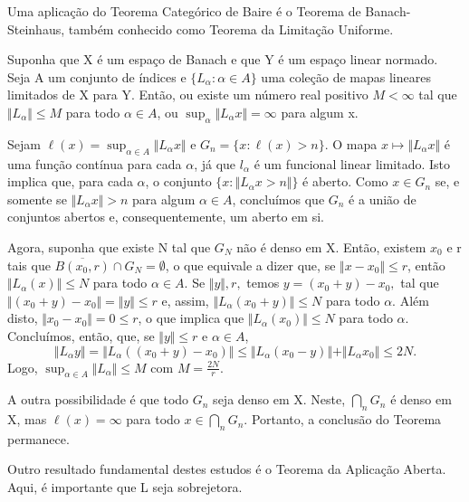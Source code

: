 \documentclass[measure_theory.tex]{subfiles}
\begin{document}
Uma aplicação do Teorema Categórico de Baire é o Teorema de Banach-Steinhaus, também conhecido como Teorema da Limitação Uniforme.
\hypertarget{banach_steinhauss}{
	\begin{theorem*}
		Suponha que X é um espaço de Banach e que Y é um espaço linear normado. Seja A um conjunto de índices e \(\{L_{\alpha }: \alpha \in A \}\) uma coleção de mapas lineares limitados de X para Y. Então, ou existe
		um número real positivo \(M<\infty\) tal que \(\Vert L_{\alpha } \Vert\leq M\) para todo \(\alpha \in A\), ou \(\sup_{\alpha }\Vert L_{\alpha }x \Vert = \infty\) para algum x.
	\end{theorem*}
}
\begin{proof*}
	Sejam \(\ell (x) = \sup_{\alpha \in A}\Vert L_{\alpha }x \Vert\) e \(G_{n} = \{x:\ell (x) > n\}\). O mapa \(x\mapsto \Vert L_{\alpha }x \Vert\) é uma função contínua para cada \(\alpha \), já que \(l_{\alpha }\) é um funcional linear limitado. Isto implica que, para cada \(\alpha \), o conjunto
	\(\{x: \Vert L_{\alpha }x > n\Vert\}\) é aberto. Como \(x\in G_{n}\) se, e somente se \(\Vert L_{\alpha }x \Vert > n\) para algum \(\alpha \in A\), concluímos que \(G_{n}\) é a união de conjuntos abertos e, consequentemente, um aberto em si.

	Agora, suponha que existe N tal que \(G_{N}\) não é denso em X. Então, existem \(x_{0}\) e r tais que \(\overline{B(x_{0}, r)}\cap G_{N} = \emptyset \), o que equivale a dizer que, se \(\Vert x-x_{0} \Vert\leq r\), então \(\Vert L_{\alpha }(x) \Vert\leq N\) para todo \(\alpha \in A\).
	Se \(\Vert y \Vert, r,\) temos \(y=(x_{0}+y) - x_{0},\) tal que \(\Vert (x_{0}+y) - x_{0} \Vert = \Vert y \Vert\leq r\) e, assim, \(\Vert L_{\alpha }(x_{0} + y) \Vert\leq N\) para todo \(\alpha \). Além disto, \(\Vert x_{0}-x_{0} \Vert = 0 \leq r\), o que implica que \(\Vert L_{\alpha }(x_{0}) \Vert\leq N\) para todo \(\alpha \).
	Concluímos, então, que, se \(\Vert y \Vert\leq r\) e \(\alpha \in A\),
	\[
		\Vert L_{\alpha }y \Vert = \Vert L_{\alpha }((x_{0}+y) - x_{0}) \Vert\leq \Vert L_{\alpha }(x_{0}-y) \Vert + \Vert L_{\alpha }x_{0} \Vert\leq 2N.
	\]
	Logo, \(\sup_{\alpha \in A}\Vert L_{\alpha } \Vert\leq M\) com \(M = \frac{2N}{r}\).

	A outra possibilidade é que todo \(G_{n}\) seja denso em X. Neste, \(\bigcap_{n}^{}G_{n}\) é denso em X, mas \(\ell (x) = \infty\) para todo \(x\in \bigcap_{n}^{}G_{n}\). Portanto, a conclusão do Teorema permanece. \qedsymbol
\end{proof*}
Outro resultado fundamental destes estudos é o Teorema da Aplicação Aberta. Aqui, é importante que L seja sobrejetora.
\end{document}
